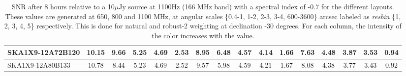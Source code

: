 \begin{table}[htp]
{{\begin{tabular}{|lccccc||ccccc||ccccc|}
SKA1X9-12A72B120 & 10.15 \cellcolor{blue!47.58} & 9.66 \cellcolor{red!42.34} & 5.25 \cellcolor{green!19.62} & 4.69 \cellcolor{orange!18.00} & 2.53 \cellcolor{purple!29.67} & 8.95 \cellcolor{blue!46.78} & 6.48 \cellcolor{red!24.47} & 4.57 \cellcolor{green!18.00} & 4.14 \cellcolor{orange!18.00} & 1.66 \cellcolor{purple!18.00} & 7.63 \cellcolor{blue!51.45} & 4.48 \cellcolor{red!22.42} & 3.87 \cellcolor{green!25.37} & 3.53 \cellcolor{orange!24.77} & 0.94 \cellcolor{purple!30.00}\\ \hline 
SKA1X9-12A80B133 & 10.78 \cellcolor{blue!60.00} & 8.44 \cellcolor{red!30.87} & 5.23 \cellcolor{green!18.00} & 4.69 \cellcolor{orange!18.00} & 2.52 \cellcolor{purple!27.33} & 9.57 \cellcolor{blue!60.00} & 5.98 \cellcolor{red!18.79} & 4.59 \cellcolor{green!19.83} & 4.21 \cellcolor{orange!22.90} & 1.67 \cellcolor{purple!22.67} & 8.08 \cellcolor{blue!60.00} & 4.38 \cellcolor{red!18.00} & 3.77 \cellcolor{green!18.00} & 3.43 \cellcolor{orange!18.00} & 0.92 \cellcolor{purple!18.00}\\ \hline 
\end{tabular}}
\vspace{-0.300000cm}
\hspace{1cm} 

\vspace{.25cm}
\caption{SNR after 8 hours relative to a 10$\mu$Jy source at 1100Hz (166 MHz band) with a spectral index of -0.7 for the different layouts. These values are generated at 650, 800 and 1100 MHz, at angular scales \{0.4-1, 1-2, 2-3, 3-4, 600-3600\} arcsec labeled as {\it resbin} \{1, 2, 3, 4, 5\} respectively. This is done for natural and robust-2 weighting at declination -30 degrees. For each column, the intensity of the color increases with the value.}\label{tab:snr10}}
 \end{table}
